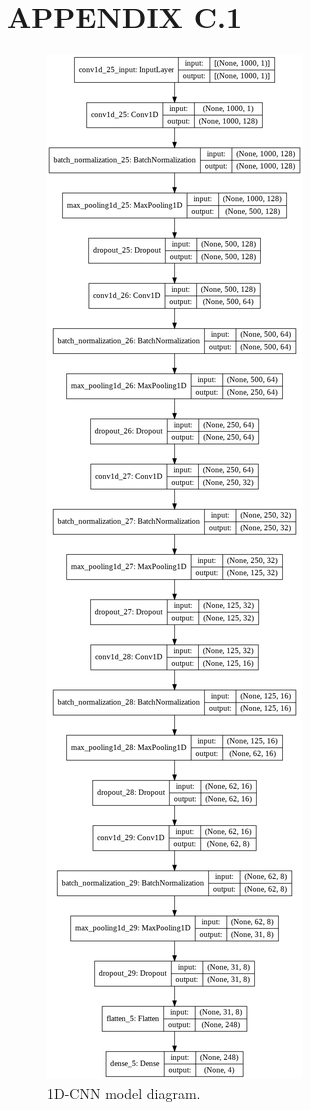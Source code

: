\chapter{APPENDIX C.1}

\begin{figure}[p]
	\centering
	\includegraphics[scale = 0.2,keepaspectratio=true]{./fig/cnnmodeldiag.PNG}
	\caption{1D-CNN model diagram.}	
	\label{cnnmodel}
\end{figure}

